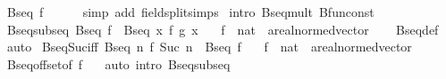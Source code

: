 \begin{isabellebody}
\ {\isachardoublequoteopen}Bseq\ f{\isachardoublequoteclose}\isanewline
\ \ \ \ \isamarkupfalse%
\ {\isacharparenleft}{\kern0pt}simp\ add{\isacharcolon}{\kern0pt}\ field{\isacharunderscore}{\kern0pt}split{\isacharunderscore}{\kern0pt}simps{\isacharparenright}{\kern0pt}\isanewline
{}\isamarkupfalse%
\ {\isacharparenleft}{\kern0pt}intro\ Bseq{\isacharunderscore}{\kern0pt}mult\ Bfun{\isacharunderscore}{\kern0pt}const{\isacharparenright}{\kern0pt}%
\endisatagproof
{\isafoldproof}%
%
\isadelimproof
\isanewline
%
\endisadelimproof
\isanewline
{}\isamarkupfalse%
\ Bseq{\isacharunderscore}{\kern0pt}subseq{\isacharcolon}{\kern0pt}\ {\isachardoublequoteopen}Bseq\ f\ {\isasymLongrightarrow}\ Bseq\ {\isacharparenleft}{\kern0pt}{\isasymlambda}x{\isachardot}{\kern0pt}\ f\ {\isacharparenleft}{\kern0pt}g\ x{\isacharparenright}{\kern0pt}{\isacharparenright}{\kern0pt}{\isachardoublequoteclose}\isanewline
\ \ \ f\ {\isacharcolon}{\kern0pt}{\isacharcolon}{\kern0pt}\ {\isachardoublequoteopen}nat\ {\isasymRightarrow}\ {\isacharprime}{\kern0pt}a{\isacharcolon}{\kern0pt}{\isacharcolon}{\kern0pt}real{\isacharunderscore}{\kern0pt}normed{\isacharunderscore}{\kern0pt}vector{\isachardoublequoteclose}\isanewline
%
\isadelimproof
\ \ %
\endisadelimproof
%
\isatagproof
{}\isamarkupfalse%
\ Bseq{\isacharunderscore}{\kern0pt}def\ \isamarkupfalse%
\ auto%
\endisatagproof
{\isafoldproof}%
%
\isadelimproof
\isanewline
%
\endisadelimproof
\isanewline
{}\isamarkupfalse%
\ Bseq{\isacharunderscore}{\kern0pt}Suc{\isacharunderscore}{\kern0pt}iff{\isacharcolon}{\kern0pt}\ {\isachardoublequoteopen}Bseq\ {\isacharparenleft}{\kern0pt}{\isasymlambda}n{\isachardot}{\kern0pt}\ f\ {\isacharparenleft}{\kern0pt}Suc\ n{\isacharparenright}{\kern0pt}{\isacharparenright}{\kern0pt}\ {\isasymlongleftrightarrow}\ Bseq\ f{\isachardoublequoteclose}\isanewline
\ \ \ f\ {\isacharcolon}{\kern0pt}{\isacharcolon}{\kern0pt}\ {\isachardoublequoteopen}nat\ {\isasymRightarrow}\ {\isacharprime}{\kern0pt}a{\isacharcolon}{\kern0pt}{\isacharcolon}{\kern0pt}real{\isacharunderscore}{\kern0pt}normed{\isacharunderscore}{\kern0pt}vector{\isachardoublequoteclose}\isanewline
%
\isadelimproof
\ \ %
\endisadelimproof
%
\isatagproof
{}\isamarkupfalse%
\ Bseq{\isacharunderscore}{\kern0pt}offset{\isacharbrackleft}{\kern0pt}of\ f\ {}{\isacharbrackright}{\kern0pt}\ \isamarkupfalse%
\ {\isacharparenleft}{\kern0pt}auto\ intro{\isacharcolon}{\kern0pt}\ Bseq{\isacharunderscore}{\kern0pt}subseq{\isacharparenright}{\kern0pt}%

\end{isabellebody}
